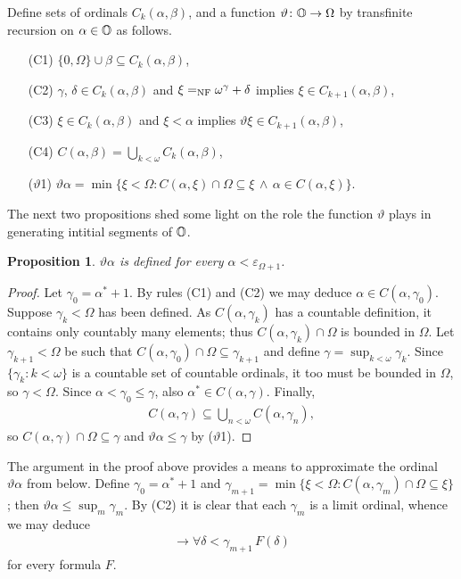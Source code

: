 \documentclass[UKenglish,cleveref,DIV=12]{scrartcl}
\newtheorem{proposition}[lemma]{Proposition}
\theoremstyle{definition}
\theoremstyle{definition}
\begin{document}
Define sets of ordinals $C_k(\alpha,\beta)$, and a function $\vartheta\colon\mathbb{O}\to\Omega$ by transfinite recursion on $\alpha\in\mathbb{O}$ as follows.
\begin{itemize}
 \item [(C1)] $\{0,\Omega\}\cup\beta\subseteq C_k(\alpha,\beta)$,
 \item [(C2)] $\gamma$, $\delta\in C_k(\alpha,\beta)$ and $\xi=_{\mathrm{NF}}\omega^\gamma+\delta$ implies $\xi\in C_{k+1}(\alpha,\beta)$,
 \item [(C3)] $\xi\in C_k(\alpha,\beta)$ and $\xi<\alpha$ implies $\vartheta\xi\in C_{k+1}(\alpha,\beta)$,
 \item [(C4)] $C(\alpha,\beta)=\bigcup_{k<\omega} C_k(\alpha,\beta)$,
 \item [($\vartheta$1)] $\vartheta\alpha=\min\{\xi<\Omega: C(\alpha,\xi)\cap\Omega\subseteq\xi\,\land\,\alpha\in C(\alpha,\xi)\}$.
\end{itemize}
The next two propositions shed some light on the role the function
$\vartheta$ plays in generating intitial segments of $\mathbb{O}$.
\begin{proposition}\label{prop:theta1}
 $\vartheta\alpha$ is defined for every $\alpha<\varepsilon_{\Omega+1}$.
\end{proposition}
\begin{proof}
 Let $\gamma_0=\alpha^*+1$. By rules (C1) and (C2) we may deduce $\alpha\in C(\alpha,\gamma_0)$. Suppose $\gamma_k<\Omega$ has been defined. As $C(\alpha,\gamma_k)$ has a countable definition, it contains only countably many elements; thus $C(\alpha,\gamma_k)\cap\Omega$ is bounded in $\Omega$. Let $\gamma_{k+1}<\Omega$ be such that $C(\alpha,\gamma_0)\cap\Omega\subseteq\gamma_{k+1}$ and define $\gamma=\sup_{k<\omega}\gamma_k$. Since $\{\gamma_k:k<\omega\}$ is a countable set of countable ordinals, it too must be bounded in $\Omega$, so $\gamma<\Omega$. Since $\alpha<\gamma_0\le\gamma$, also $\alpha^*\in C(\alpha,\gamma)$. Finally,
 \begin{align*}
  C(\alpha,\gamma)\subseteq\bigcup_{n<\omega}C(\alpha,\gamma_n),
 \end{align*}
 so $C(\alpha,\gamma)\cap\Omega\subseteq \gamma$ and $\vartheta\alpha\le\gamma$ by ($\vartheta$1).
\end{proof}

The argument in the proof above provides a means to approximate the ordinal $\vartheta\alpha$ from below. Define $\gamma_0=\alpha^*+1$ and $\gamma_{m+1}=\min\{\xi<\Omega:C(\alpha,\gamma_m)\cap\Omega\subseteq\xi\}$; then $\vartheta\alpha\le\sup_{m}\gamma_m$. By (C2) it is clear that each $\gamma_m$ is a limit ordinal, whence we may deduce
\begin{align*}
 [(\forall\delta\in C(\alpha,\gamma_m)\cap\Omega)\forall\xi<\delta\,F(\xi)]\rightarrow \forall\delta<\gamma_{m+1}\,F(\delta)
\end{align*}
for every formula $F$.
\end{document}
